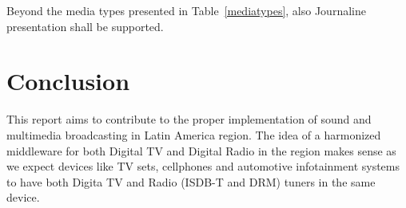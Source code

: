 \documentclass[11pt]{article}
\begin{document}
Beyond the media types presented in Table~\ref{mediatypes}, also
Journaline~\cite{ETSI-102979-2008} presentation shall be supported.



\section{Conclusion}
\label{sec:conclusion}

This report aims to contribute to the proper implementation of sound and
multimedia broadcasting in Latin America region. The idea of a harmonized
middleware for both Digital TV and Digital Radio in the region makes sense
as we expect devices like TV sets, cellphones and automotive infotainment
systems to have both Digita TV and Radio (ISDB-T and DRM) tuners in the same
device.
\pagebreak


{}

\end{document}
